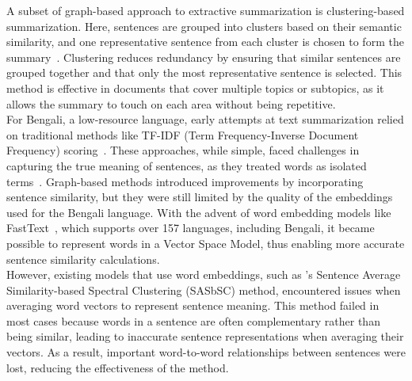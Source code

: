 A subset of graph-based approach to extractive summarization is clustering-based summarization.
Here, sentences are grouped into clusters based on their semantic similarity, and one representative sentence from each
cluster is chosen to form the summary~\cite{Mohan-2022-topic-modeling-rev-clustering}.
Clustering reduces redundancy by ensuring that similar sentences are grouped together and that only the most
representative sentence is selected.
This method is effective in documents that cover multiple topics or subtopics, as it allows the summary to touch on
each area without being repetitive.\\

For Bengali, a low-resource language, early attempts at text summarization relied on traditional methods like TF-IDF
(Term Frequency-Inverse Document Frequency) scoring~\cite{das-2022-tfidf,sarkar-2012-tfidf}.
These approaches, while simple, faced challenges in capturing the true meaning of sentences, as they treated words as
isolated terms~\cite{tas-2017-rev-text-sum-2}.
Graph-based methods introduced improvements by incorporating sentence similarity, but they were still limited by the
quality of the embeddings used for the Bengali language.
With the advent of word embedding models like FastText~\cite{grave-etal-2018-fasttext}, which supports over 157
languages, including Bengali, it became possible to represent words in a Vector Space Model, thus enabling
more accurate sentence similarity calculations.\\

However, existing models that use word embeddings, such as \citeauthor{roychowdhury-etal-2022-spectral-base}’s
\cite{roychowdhury-etal-2022-spectral-base} Sentence Average Similarity-based Spectral Clustering (SASbSC) method,
encountered issues when averaging word vectors to represent sentence meaning.
This method failed in most cases because words in a sentence are often complementary rather than being similar, leading
to inaccurate sentence representations when averaging their vectors.
As a result, important word-to-word relationships between sentences were lost, reducing the effectiveness of the method.\\

